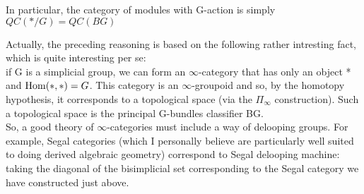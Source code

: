 \begin{refsection}
In particular, the category of modules with G-action is simply $QC(*/G)=QC(BG)$

\begin{rmk}
Actually, the preceding reasoning is based on the following rather intresting fact, which is quite interesting per se:\\
if G is a simplicial group, we can form an $\infty$-category that has only an object * and $\mathrm{Hom}(*,*)=G$. This category is an $\infty$-groupoid and so, by the homotopy
hypothesis, it corresponds to a topological space (via the $\Pi_{\infty}$ construction). Such a topological space is the principal G-bundles classifier BG.\\
So, a good theory of $\infty$-categories must include a way of delooping groups. For example, Segal categories (which I personally believe are particularly well suited to
doing derived algebraic geometry) correspond to Segal delooping machine: taking the diagonal of the bisimplicial set corresponding to the Segal category we have constructed
just above.
\end{rmk}

\nocite{hypercover, htt, lurieHA, to1, to2, to3}
\printbibliography[heading = local]

\end{refsection}
